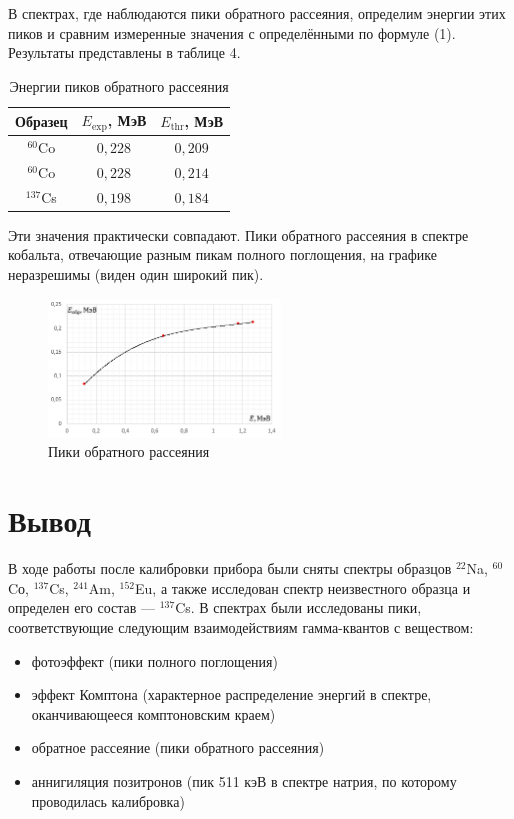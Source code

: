 \documentclass[a4paper]{article}
\begin{document}
\noindent В спектрах, где наблюдаются пики обратного рассеяния, определим энергии этих пиков и сравним измеренные значения с определёнными по формуле (1). Результаты представлены в таблице 4. 

\begin{table}[!ht]
    \centering
    \caption{Энергии пиков обратного рассеяния}
    \begin{tabular}{|c|c|c|}
    \hline
    Образец & $E_{\text{exp}}$, МэВ & $E_{\text{thr}}$, МэВ \\ \hline
    $^{60}$Co      & $0,228$               & $0,209$               \\ \hline
    $^{60}$Co      & $0,228$               & $0,214$               \\ \hline
    $^{137}$Cs      & $0,198$               & $0,184$               \\ \hline
    \end{tabular}
\end{table}

\noindent Эти значения практически совпадают. Пики обратного рассеяния в спектре кобальта, отвечающие разным пикам полного поглощения, на графике неразрешимы (виден один широкий пик).

\begin{figure}[!ht]
    \begin{center}
        \includegraphics[width = 0.55\textwidth]{image/pic4.png}
        \caption{Пики обратного рассеяния}
    \end{center}
\end{figure}

\section{Вывод}

В ходе работы после калибровки прибора были сняты спектры образцов $^{22}$Na,  $^{60}$Cо,  $^{137}$Cs, $^{241}$Am, $^{152}$Eu, а также исследован спектр неизвестного образца и определен его состав --- $^{137}$Cs. В спектрах были исследованы пики, соответствующие следующим взаимодействиям гамма-квантов с веществом:
\begin{itemize}
    \item фотоэффект (пики полного поглощения)
    \item эффект Комптона (характерное распределение энергий в спектре, оканчивающееся комптоновским краем)
    \item обратное рассеяние (пики обратного рассеяния)
    \item аннигиляция позитронов (пик 511 кэВ в спектре натрия, по которому проводилась калибровка)
\end{itemize}
\end{document}
